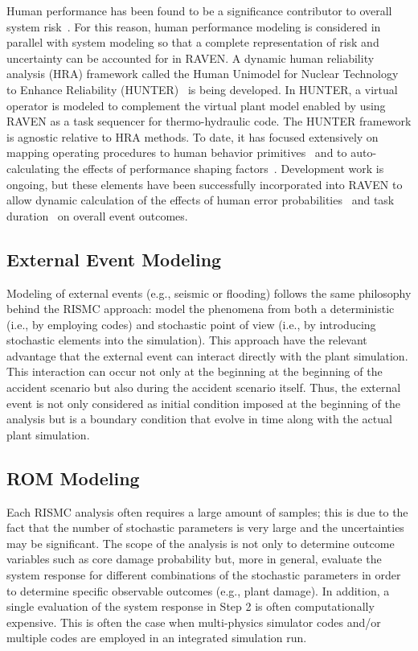 Human performance has been found to be a significance contributor to overall system 
risk~\cite{NUREG/CR-6753}. 
For this reason, human performance modeling is considered in parallel with system modeling so 
that a complete representation of risk and uncertainty can be accounted for in RAVEN. 
A dynamic human reliability analysis (HRA) framework called the Human Unimodel for 
Nuclear Technology to Enhance
Reliability (HUNTER)~\cite{boringHUNTER} is being developed. In HUNTER, a virtual operator is modeled to 
complement the virtual plant model enabled by using RAVEN as a task sequencer for thermo-hydraulic 
code. The HUNTER framework is agnostic relative to HRA methods. To date, it has focused 
extensively on mapping operating procedures to human behavior primitives~\cite{GOMSHRA} and to
auto-calculating the effects of performance shaping factors~\cite{DynamicizingSPAR}. Development work is
 ongoing, but these elements have been successfully incorporated into RAVEN to allow dynamic 
 calculation of the effects of human error probabilities~\cite{boringTaskProcedures} and task 
 duration~\cite{boringOperatorTiming} on overall event outcomes.


\subsection{External Event Modeling}
Modeling of external events (e.g., seismic or flooding) follows the same philosophy behind the RISMC
approach: model the phenomena from both a deterministic (i.e., by employing codes) and stochastic 
point of view (i.e., by introducing stochastic elements into the simulation). This approach have the 
relevant advantage that the external event can interact directly with the plant simulation. 
This interaction can occur not only at the beginning at the beginning of the accident scenario but also
during the accident scenario itself. Thus, the external event is not only considered as initial condition
imposed at the beginning of the analysis but is a boundary condition that evolve in time along with the
actual plant simulation.

\subsection{ROM Modeling}
Each RISMC analysis often requires a large amount of samples; this is due to the fact that the 
number of stochastic parameters is very large and the uncertainties may be significant. 
The scope of the analysis is not only to determine outcome variables such as core damage probability 
but, more in general, evaluate the system response for different combinations of the stochastic
parameters in order to determine specific observable outcomes (e.g., plant damage). In addition, 
a single evaluation of the system response in Step 2 is often computationally expensive. 
This is often the case when multi-physics simulator codes and/or multiple codes are employed in an 
integrated simulation run.

